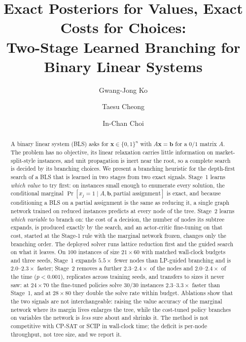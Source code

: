 \documentclass[final,5p,times,twocolumn,authoryear]{elsarticle}
\begin{document}
\begin{frontmatter}

\title{Exact Posteriors for Values, Exact Costs for Choices:\\
Two-Stage Learned Branching for Binary Linear Systems}

\author[ku]{Gwang-Jong Ko}
\author[ku]{Taesu Cheong}
\author[ku]{In-Chan Choi}

\begin{abstract}
A binary linear system (BLS) asks for $\mathbf{x}\in\{0,1\}^n$ with $A\mathbf{x}=\mathbf{b}$ for a $0/1$ matrix $A$. The problem has no objective, its linear relaxation carries little information on market-split-style instances, and unit propagation is inert near the root, so a complete search is decided by its branching choices. We present a branching heuristic for the depth-first search of a BLS that is learned in two stages from two exact signals. Stage~1 learns \emph{which value} to try first: on instances small enough to enumerate every solution, the conditional marginal $\Pr[x_j{=}1\mid A,\mathbf{b},\text{partial assignment}]$ is exact, and because conditioning a BLS on a partial assignment is the same as reducing it, a single graph network trained on reduced instances predicts at every node of the tree. Stage~2 learns \emph{which variable} to branch on: the cost of a decision, the number of nodes its subtree expands, is produced exactly by the search, and an actor-critic fine-tuning on that cost, started at the Stage-1 rule with the marginal network frozen, changes only the branching order. The deployed solver runs lattice reduction first and the guided search on what it leaves. On $100$ instances of size $21\times60$ with matched wall-clock budgets and three seeds, Stage~1 expands $5.5\times$ fewer nodes than LP-guided branching and is $2.0$--$2.3\times$ faster; Stage~2 removes a further $2.3$--$2.4\times$ of the nodes and $2.0$--$2.4\times$ of the time ($p<0.001$), replicates across training seeds, and transfers to sizes it never saw: at $24\times70$ the fine-tuned policies solve $30/30$ instances $2.3$--$3.3\times$ faster than Stage~1, and at $28\times80$ they double the solve rate within budget. Ablations show that the two signals are not interchangeable: raising the value accuracy of the marginal network where its margin lives enlarges the tree, while the cost-tuned policy branches on variables the network is \emph{less} sure about and shrinks it. The method is not competitive with CP-SAT or SCIP in wall-clock time; the deficit is per-node throughput, not tree size, and we report it.
\end{abstract}


\end{frontmatter}
\end{document}

